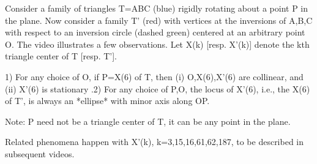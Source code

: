 Consider a family of triangles T=ABC (blue) rigidly rotating about a point P in the plane. Now consider a family T' (red) with vertices at the inversions of A,B,C with respect to an inversion circle (dashed green) centered at an arbitrary point O. The video illustrates a few observations. Let X(k) [resp. X'(k)] denote the kth triangle center of T [resp. T'].

1) For any choice of O, if P=X(6) of T, then (i) O,X(6),X'(6) are collinear, and (ii) X'(6) is stationary
.2) For any choice of P,O, the locus of X'(6), i.e., the X(6) of T', is always an *ellipse* with minor axis along OP.

Note: P need not be a triangle center of T, it can be any point in the plane.

Related phenomena happen with X'(k), k=3,15,16,61,62,187, to be described in subsequent videos.